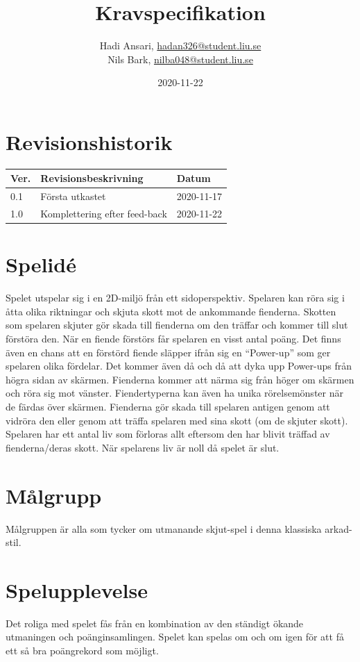 \documentclass{TDP005mall}
\author{Hadi Ansari, \url{hadan326@student.liu.se}\\
  Nils Bark, \url{nilba048@student.liu.se}}
\title{Kravspecifikation}
\date{2020-11-22}
\begin{document}
\projectpage
\tableofcontents
\thispagestyle{empty}
\cleardoublepage

\section{Revisionshistorik}
\begin{table}[!h]
\begin{tabularx}{\linewidth}{|l|X|l|}
\hline
Ver. & Revisionsbeskrivning & Datum \\\hline
0.1 & Första utkastet & 2020-11-17 \\\hline
1.0 & Komplettering efter feed-back& 2020-11-22 \\\hline

\end{tabularx}
\end{table}


\section{Spelidé}
Spelet utspelar sig i en 2D-miljö från ett sidoperspektiv.
Spelaren kan röra sig i åtta olika
riktningar och skjuta skott mot de ankommande fienderna. Skotten som spelaren skjuter gör
skada till fienderna om den träffar och kommer till slut förstöra den. När en fiende förstörs
får spelaren en visst antal poäng. Det finns även en chans att en förstörd fiende släpper
ifrån sig en ``Power-up'' som ger spelaren olika fördelar. Det kommer även då och då att
dyka upp Power-ups från högra sidan av skärmen. Fienderna kommer att närma sig från höger
om skärmen och röra sig mot vänster. Fiendertyperna kan även ha unika rörelsemönster när
de färdas över skärmen. Fienderna gör skada till spelaren antigen genom att vidröra den
eller genom att träffa spelaren med sina skott (om de skjuter skott). Spelaren har ett
antal liv som förloras allt eftersom den har blivit träffad av fienderna/deras skott.
När spelarens liv är noll då spelet är slut.

\section{Målgrupp}
Målgruppen är alla som tycker om utmanande skjut-spel i denna klassiska arkad-stil.

\section{Spelupplevelse}
Det roliga med spelet fås från en kombination av den ständigt ökande utmaningen och poänginsamlingen. Spelet kan spelas om och om igen för att få ett så bra poängrekord som möjligt.
\end{document}
